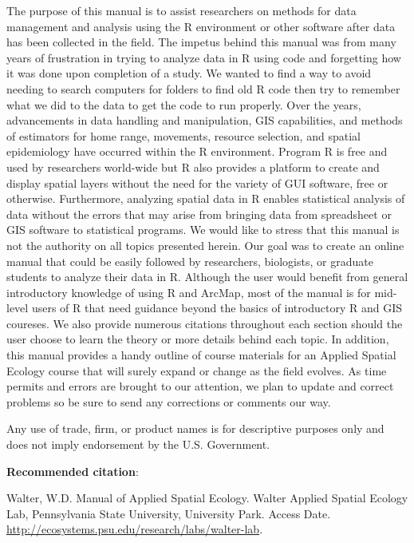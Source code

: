 \documentclass[
  letterpaper,
]{book}
\begin{document}
The purpose of this manual is to assist researchers on methods for data
management and analysis using the R environment or other software after
data has been collected in the field. The impetus behind this manual was
from many years of frustration in trying to analyze data in R using code
and forgetting how it was done upon completion of a study. We wanted to
find a way to avoid needing to search computers for folders to find old
R code then try to remember what we did to the data to get the code to
run properly. Over the years, advancements in data handling and
manipulation, GIS capabilities, and methods of estimators for home
range, movements, resource selection, and spatial epidemiology have
occurred within the R environment. Program R is free and used by
researchers world-wide but R also provides a platform to create and
display spatial layers without the need for the variety of GUI software,
free or otherwise. Furthermore, analyzing spatial data in R enables
statistical analysis of data without the errors that may arise from
bringing data from spreadsheet or GIS software to statistical programs.
We would like to stress that this manual is not the authority on all
topics presented herein. Our goal was to create an online manual that
could be easily followed by researchers, biologists, or graduate
students to analyze their data in R. Although the user would benefit
from general introductory knowledge of using R and ArcMap, most of the
manual is for mid-level users of R that need guidance beyond the basics
of introductory R and GIS coureses. We also provide numerous citations
throughout each section should the user choose to learn the theory or
more details behind each topic. In addition, this manual provides a
handy outline of course materials for an Applied Spatial Ecology course
that will surely expand or change as the field evolves. As time permits
and errors are brought to our attention, we plan to update and correct
problems so be sure to send any corrections or comments our way.

Any use of trade, firm, or product names is for descriptive purposes
only and does not imply endorsement by the U.S. Government.

\textbf{Recommended citation}:

Walter, W.D. Manual of Applied Spatial Ecology. Walter Applied Spatial
Ecology Lab, Pennsylvania State University, University Park. Access
Date. \url{http://ecosystems.psu.edu/research/labs/walter-lab}.

\newpage
\end{document}

